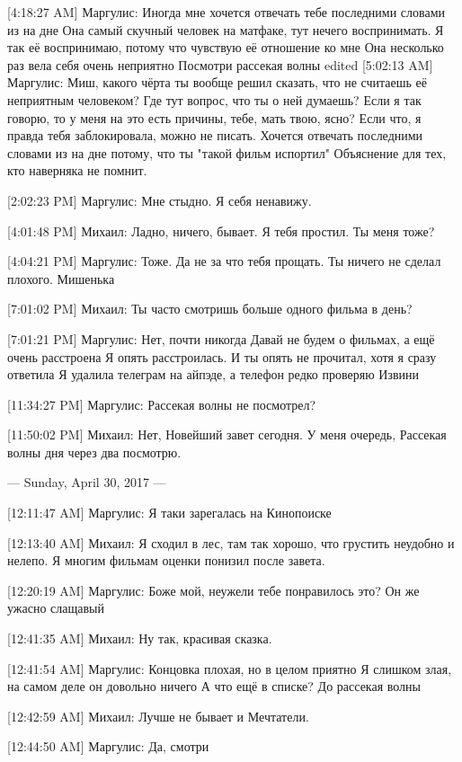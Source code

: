 \documentclass{article}
\begin{document}
[4:18:27 AM] Маргулис:
Иногда мне хочется отвечать тебе последними словами из на дне
 Она самый скучный человек на матфаке, тут нечего воспринимать. Я так её воспринимаю, потому что чувствую её отношение ко мне
 Она несколько раз вела себя очень неприятно
 Посмотри рассекая волны
edited 
[5:02:13 AM] Маргулис:
Миш, какого чёрта ты вообще решил сказать, что не считаешь её неприятным человеком? Где тут вопрос, что ты о ней думаешь? Если я так говорю, то у меня на это есть причины, тебе, мать твою, ясно?
 Если что, я правда тебя заблокировала, можно не писать.
 Хочется отвечать последними словами из на дне потому, что ты "такой фильм испортил"
 Объяснение для тех, кто наверняка не помнит.

[2:02:23 PM] Маргулис:
Мне стыдно.
 Я себя ненавижу.

[4:01:48 PM] Михаил:
Ладно, ничего, бывает. Я тебя простил. Ты меня тоже?

[4:04:21 PM] Маргулис:
Тоже.
 Да не за что тебя прощать. Ты ничего не сделал плохого.
 Мишенька

[7:01:02 PM] Михаил:
Ты часто смотришь больше одного фильма в день?

[7:01:21 PM] Маргулис:
Нет, почти никогда
 Давай не будем о фильмах, а ещё очень расстроена
 Я опять расстроилась.
 И ты опять не прочитал, хотя я сразу ответила
 Я удалила телеграм на айпэде, а телефон редко проверяю
 Извини

[11:34:27 PM] Маргулис:
Рассекая волны не посмотрел?

[11:50:02 PM] Михаил:
Нет, Новейший завет сегодня. У меня очередь, Рассекая волны дня через два посмотрю.

--- Sunday, April 30, 2017 ---

[12:11:47 AM] Маргулис:
Я таки зарегалась на Кинопоиске

[12:13:40 AM] Михаил:
Я сходил в лес, там так хорошо, что грустить неудобно и нелепо.
 Я многим фильмам оценки понизил после завета.

[12:20:19 AM] Маргулис:
Боже мой, неужели тебе понравилось это? Он же ужасно слащавый

[12:41:35 AM] Михаил:
Ну так, красивая сказка.

[12:41:54 AM] Маргулис:
Концовка плохая, но в целом приятно
 Я слишком злая, на самом деле он довольно ничего
 А что ещё в списке?
 До рассекая волны

[12:42:59 AM] Михаил:
Лучше не бывает и Мечтатели.

[12:44:50 AM] Маргулис:
Да, смотри
\end{document}
